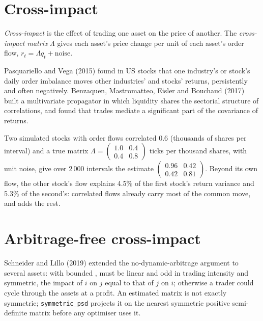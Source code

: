\section{Cross-impact}

\begin{definition}\label{def:mx:metaorders-latent-liquidity-and-cross-impact:cross}
\emph{Cross-impact} is the effect of trading one asset on the price of another. The \emph{cross-impact matrix}
$\Lambda$ gives each asset's price change per unit of each asset's order flow, $r_t=\Lambda q_t+\text{noise}$.
\end{definition}

Pasquariello and Vega (2015) found in US stocks that one industry's or stock's daily order imbalance moves other industries' and stocks' returns,
persistently and often negatively. Benzaquen, Mastromatteo, Eisler and Bouchaud (2017) built a multivariate propagator in which liquidity shares the
sectorial structure of correlations, and found that trades mediate a significant part of the covariance of returns.

Two simulated stocks with order flows correlated 0.6 (thousands of shares per interval) and a true matrix $\Lambda=\begin{pmatrix}1.0&0.4\\0.4&0.8\end{pmatrix}$
ticks per thousand shares, with unit noise, give over 2\,000 intervals the estimate $\begin{pmatrix}0.96&0.42\\0.42&0.81\end{pmatrix}$. Beyond its own flow,
the other stock's flow explains 4.5\% of the first stock's return variance and 5.3\% of the second's: correlated flows already carry most of the
common move, and  adds the rest.

\section{Arbitrage-free cross-impact}

Schneider and Lillo (2019) extended the no-dynamic-arbitrage argument to several assets: with bounded ,  must be linear and odd in
trading intensity and symmetric, the impact of $i$ on $j$ equal to that of $j$ on $i$; otherwise a trader could cycle through the assets at a profit.
An estimated matrix is not exactly symmetric; \texttt{symmetric\_psd} projects it on the nearest symmetric positive semi-definite matrix before any
optimiser uses it.

